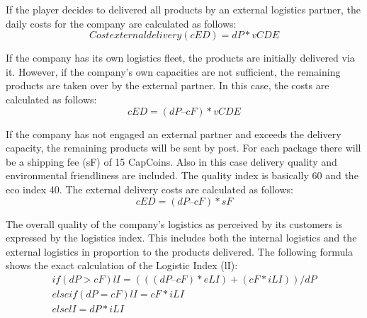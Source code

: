 If the player decides to delivered all products by an external logistics partner, the daily costs for the company are calculated as follows:
\begin{equation}
    Cost external delivery (cED) = dP * vCDE
\end{equation}

If the company has its own logistics fleet, the products are initially delivered via it. However, if the company's own capacities are not sufficient, the remaining products are taken over by the external partner. In this case, the costs are calculated as follows: 
\begin{equation}
    cED = ( dP – cF ) * vCDE
\end{equation}

If the company has not engaged an external partner and exceeds the delivery capacity, the remaining products will be sent by post. For each package there will be a shipping fee (\gls{sF}) of 15 CapCoins. Also in this case delivery quality and environmental friendliness are included. The quality index is basically 60 and the eco index 40. The external delivery costs are calculated as follows:  
\begin{equation}
    cED = ( dP – cF ) * sF
\end{equation}

The overall quality of the company's logistics as perceived by its customers is expressed by the logistics index. This includes both the internal logistics and the external logistics in proportion to the products delivered. The following formula shows the exact calculation of the Logistic Index (\gls{lI}):
\begin{equation}
\begin{aligned}
    if ( dP > cF ) lI = { ((( dP – cF) * eLI ) + ( cF * iLI )) / dP} \\
    elseif ( dP = cF ) lI = { cF * iLI } \\
    else lI = { dP * iLI }  
\end{aligned}
\end{equation}